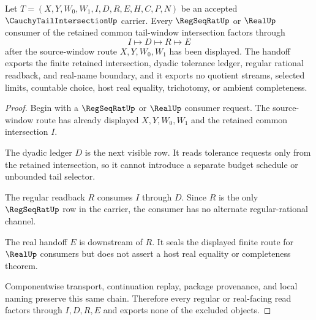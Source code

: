 \begin{theorem}
\label{thm:cauchy-tail-intersection-regseqrat-handoff}
Let $T=(X,Y,W_0,W_1,I,D,R,E,H,C,P,N)$ be an accepted $\CauchyTailIntersectionUp$ carrier. Every $\RegSeqRatUp$ or $\RealUp$ consumer of the retained common tail-window intersection factors through
$$
I \longmapsto D \longmapsto R \longmapsto E
$$
after the source-window route $X,Y,W_0,W_1$ has been displayed. The handoff exports the finite retained intersection, dyadic tolerance ledger, regular rational readback, and real-name boundary, and it exports no quotient streams, selected limits, countable choice, host real equality, trichotomy, or ambient completeness.
\end{theorem}
\begin{proof}
Begin with a $\RegSeqRatUp$ or $\RealUp$ consumer request. The source-window route has already displayed $X,Y,W_0,W_1$ and the retained common intersection $I$.

The dyadic ledger $D$ is the next visible row. It reads tolerance requests only from the retained intersection, so it cannot introduce a separate budget schedule or unbounded tail selector.

The regular readback $R$ consumes $I$ through $D$. Since $R$ is the only $\RegSeqRatUp$ row in the carrier, the consumer has no alternate regular-rational channel.

The real handoff $E$ is downstream of $R$. It seals the displayed finite route for $\RealUp$ consumers but does not assert a host real equality or completeness theorem.

Componentwise transport, continuation replay, package provenance, and local naming preserve this same chain. Therefore every regular or real-facing read factors through $I,D,R,E$ and exports none of the excluded objects.
\end{proof}


